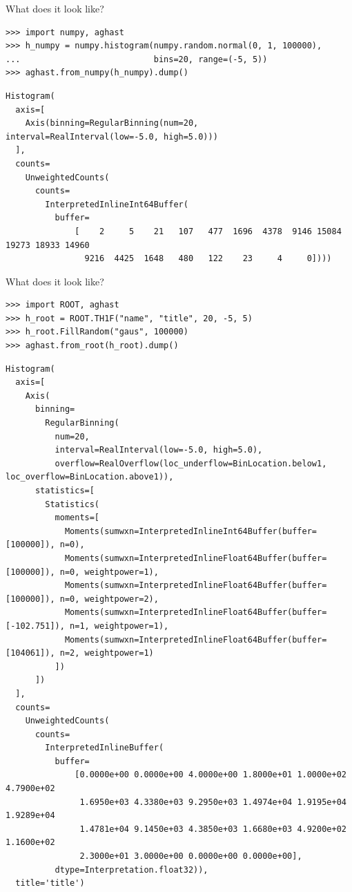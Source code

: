 \documentclass[aspectratio=169]{beamer}
\begin{document}
\begin{frame}[fragile]{What does it look like?}
\small
\begin{verbatim}
>>> import numpy, aghast
>>> h_numpy = numpy.histogram(numpy.random.normal(0, 1, 100000),
...                           bins=20, range=(-5, 5))
>>> aghast.from_numpy(h_numpy).dump()
\end{verbatim}

\scriptsize
\begin{verbatim}
Histogram(
  axis=[
    Axis(binning=RegularBinning(num=20, interval=RealInterval(low=-5.0, high=5.0)))
  ],
  counts=
    UnweightedCounts(
      counts=
        InterpretedInlineInt64Buffer(
          buffer=
              [    2     5    21   107   477  1696  4378  9146 15084 19273 18933 14960
                9216  4425  1648   480   122    23     4     0])))
\end{verbatim}

\vspace{0.25 cm}
\end{frame}

\begin{frame}[fragile]{What does it look like?}
\small
\begin{verbatim}
>>> import ROOT, aghast
>>> h_root = ROOT.TH1F("name", "title", 20, -5, 5)
>>> h_root.FillRandom("gaus", 100000)
>>> aghast.from_root(h_root).dump()
\end{verbatim}


\tiny
\begin{verbatim}
Histogram(
  axis=[
    Axis(
      binning=
        RegularBinning(
          num=20,
          interval=RealInterval(low=-5.0, high=5.0),
          overflow=RealOverflow(loc_underflow=BinLocation.below1, loc_overflow=BinLocation.above1)),
      statistics=[
        Statistics(
          moments=[
            Moments(sumwxn=InterpretedInlineInt64Buffer(buffer=[100000]), n=0),
            Moments(sumwxn=InterpretedInlineFloat64Buffer(buffer=[100000]), n=0, weightpower=1),
            Moments(sumwxn=InterpretedInlineFloat64Buffer(buffer=[100000]), n=0, weightpower=2),
            Moments(sumwxn=InterpretedInlineFloat64Buffer(buffer=[-102.751]), n=1, weightpower=1),
            Moments(sumwxn=InterpretedInlineFloat64Buffer(buffer=[104061]), n=2, weightpower=1)
          ])
      ])
  ],
  counts=
    UnweightedCounts(
      counts=
        InterpretedInlineBuffer(
          buffer=
              [0.0000e+00 0.0000e+00 4.0000e+00 1.8000e+01 1.0000e+02 4.7900e+02
               1.6950e+03 4.3380e+03 9.2950e+03 1.4974e+04 1.9195e+04 1.9289e+04
               1.4781e+04 9.1450e+03 4.3850e+03 1.6680e+03 4.9200e+02 1.1600e+02
               2.3000e+01 3.0000e+00 0.0000e+00 0.0000e+00],
          dtype=Interpretation.float32)),
  title='title')
\end{verbatim}
\end{frame}
\end{document}
